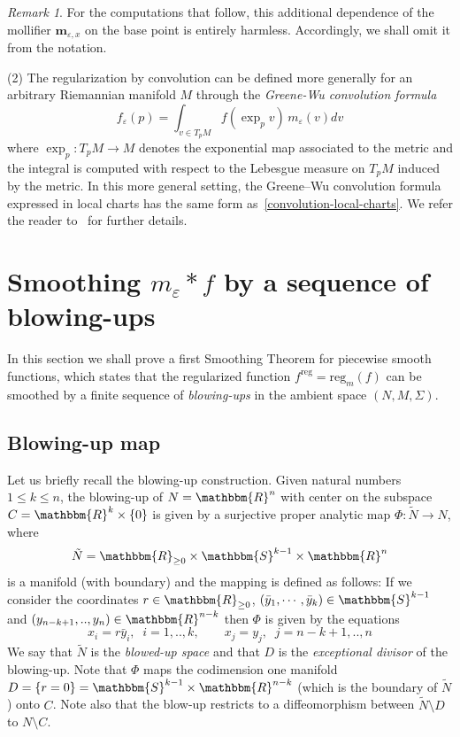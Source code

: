 \documentclass[11pt,psamsfonts]{article}
\newcommand{\tmmathbf}[1]{\ensuremath{\boldsymbol{#1}}}
\theoremstyle{definition}
\theoremstyle{remark}
\newtheorem{Remark}[Theorem]{Remark}
\newcommand{\cR}{\ensuremath{\mathbbm{R}}}
\newcommand{\eps}{\varepsilon }
\newcommand{\cS}{\mathbbm{S}}
\newcommand{\reg}{\mathrm{reg}}
\begin{document}
\begin{Remark}
For the computations that follow, this additional dependence of the mollifier
\(\tmmathbf{m}_{\varepsilon,x}\) on the base point is entirely harmless.
Accordingly, we shall omit it from the notation.

(2) The regularization by convolution can be defined more generally for an arbitrary Riemannian manifold $M$ through the {\em Greene-Wu convolution formula}
\[ f_{\varepsilon} (p) = \int_{v \in T_p M} f (\exp_p v)\, m_{\varepsilon} (v) d
   v \]
where $\exp_p:T_p M\rightarrow M$ denotes the exponential map associated to the metric and the integral is computed with respect to the Lebesgue measure on $T_p M$ induced by the metric. In this more general setting, the Greene–Wu convolution formula expressed in local charts has the same form as~\eqref{convolution-local-charts}. We refer the reader to~\cite{GreeneWu1979} for further details.
\end{Remark}
\section{Smoothing $m_\eps \ast f$ by a sequence of blowing-ups}\label{s5}
In this section we shall prove a first Smoothing Theorem for piecewise smooth functions, which states that the regularized function $f^\reg = \reg_m(f)$ can be smoothed by a finite sequence of {\em blowing-ups} in the ambient space $(N,M,\Sigma)$.
\subsection{Blowing-up map}\label{subsect-blow-up}
Let us briefly recall the blowing-up construction. Given natural numbers $1\le k \le n$, the blowing-up of $N=\cR^n$ with center on the subspace $C = \cR^k \times \{0\}$ is given by a surjective proper analytic map $\Phi: \tilde N \rightarrow N$, where 
\[
\tilde N = \cR_{\ge 0} \times \cS^{k-1} \times \cR^{n}
\]
is a manifold (with boundary) and the mapping is defined as follows: If we consider the coordinates $r\in \cR_{\ge 0}$, $(\bar y_1,\cdots,\bar y_k) \in \cS^{k-1}$ and $(y_{n-k+1},..,y_n) \in \cR^{n-k}$ then $\Phi$ is given by the equations
\[
x_i = r \bar y_i,\;\; i=1,..,k,\qquad x_j = y_j,\;\; j=n-k+1,..,n
\]
We say that $\tilde N$ is the {\em blowed-up space} and that $D$ is the {\em exceptional divisor} of the blowing-up. Note that $\Phi$ maps the codimension one manifold $D = \{r = 0\} = \cS^{k-1} \times \cR^{n-k}$ (which is the boundary of $\tilde N$) onto $C$. 
Note also that the blow-up restricts to a diffeomorphism between $\tilde N \setminus D$ to $N \setminus C$.  
\end{document}

